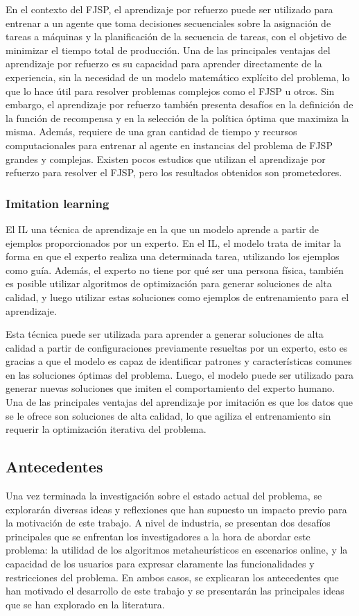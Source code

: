 En el contexto del FJSP, el aprendizaje por refuerzo puede ser utilizado para
entrenar a un agente que toma decisiones secuenciales sobre la asignación de
tareas a máquinas y la planificación de la secuencia de tareas, con el objetivo
de minimizar el tiempo total de producción. Una de las principales ventajas del
aprendizaje por refuerzo es su capacidad para aprender directamente de la
experiencia, sin la necesidad de un modelo matemático explícito del problema,
lo que lo hace útil para resolver problemas complejos como el FJSP u otros. Sin
embargo, el aprendizaje por refuerzo también presenta desafíos en la definición
de la función de recompensa y en la selección de la política óptima que
maximiza la misma. Además, requiere de una gran cantidad de tiempo y recursos
computacionales para entrenar al agente en instancias del problema de FJSP
grandes y complejas. Existen pocos estudios que utilizan el aprendizaje por
refuerzo para resolver el FJSP, pero los resultados obtenidos son prometedores.

\subsubsection{Imitation learning}
El IL \cite{SmartLab_2019} una técnica de aprendizaje en la que un modelo aprende a partir de 
ejemplos proporcionados por un experto. En el IL, el modelo trata de imitar 
la forma en que el experto realiza una determinada tarea, utilizando los 
ejemplos como guía. Además, el experto no tiene por qué ser una persona física, 
también es posible utilizar algoritmos de optimización para generar soluciones 
de alta calidad, y luego utilizar estas soluciones como ejemplos de entrenamiento 
para el aprendizaje.\medskip

Esta técnica puede ser utilizada para aprender a generar soluciones de alta
calidad a partir de configuraciones previamente resueltas por un experto, esto
es gracias a que el modelo es capaz de identificar patrones y características
comunes en las soluciones óptimas del problema. Luego, el modelo puede ser
utilizado para generar nuevas soluciones que imiten el comportamiento del
experto humano. Una de las principales ventajas del aprendizaje por imitación
es que los datos que se le ofrece son soluciones de alta calidad, lo que
agiliza el entrenamiento sin requerir la optimización iterativa del problema.

\subsection{Antecedentes}
Una vez terminada la investigación sobre el estado actual del problema, se
explorarán diversas ideas y reflexiones que han supuesto un impacto previo para
la motivación de este trabajo. A nivel de industria, se presentan dos
desafíos principales que se enfrentan los investigadores a la hora de abordar este problema:
la utilidad de los algoritmos metaheurísticos en escenarios online, y la
capacidad de los usuarios para expresar claramente las funcionalidades y
restricciones del problema. En ambos casos, se explicaran los antecedentes que
han motivado el desarrollo de este trabajo y se presentarán las principales
ideas que se han explorado en la literatura.\medskip

